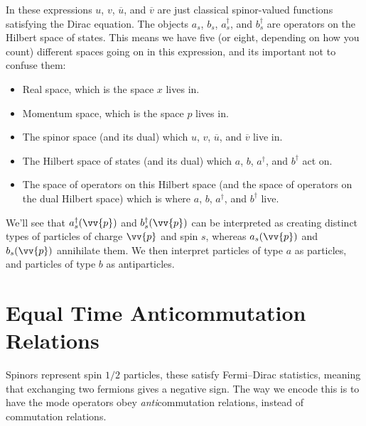 \documentclass[fleqn]{NotesClass}
\newcommand{\hermit}{{\dagger}}
\newcommand{\diracadjoint}[1]{\overbar{#1}}
\begin{document}
    In these expressions \(u\), \(v\), \(\diracadjoint{u}\), and \(\diracadjoint{v}\) are just classical spinor-valued functions satisfying the Dirac equation.
    The objects \(a_s\), \(b_s\), \(a_s^\hermit\), and \(b_s^\hermit\) are operators on the Hilbert space of states.
    This means we have five (or eight, depending on how you count) different spaces going on in this expression, and its important not to confuse them:
    \begin{itemize}
        \item Real space, which is the space \(x\) lives in.
        \item Momentum space, which is the space \(p\) lives in.
        \item The spinor space (and its dual) which \(u\), \(v\), \(\diracadjoint{u}\), and \(\diracadjoint{v}\) live in.
        \item The Hilbert space of states (and its dual) which \(a\), \(b\), \(a^\hermit\), and \(b^\hermit\) act on.
        \item The space of operators on this Hilbert space (and the space of operators on the dual Hilbert space) which is where \(a\), \(b\), \(a^\hermit\), and \(b^\hermit\) live.
    \end{itemize}
    
    We'll see that \(a_s^\hermit(\vv{p})\) and \(b_s^\hermit(\vv{p})\) can be interpreted as creating distinct types of particles of charge \(\vv{p}\) and spin \(s\), whereas \(a_s(\vv{p})\) and \(b_s(\vv{p})\) annihilate them.
    We then interpret particles of type \(a\) as particles, and particles of type \(b\) as antiparticles.
    
    \section{Equal Time Anticommutation Relations}
    Spinors represent spin \(1/2\) particles, these satisfy Fermi--Dirac statistics, meaning that exchanging two fermions gives a negative sign.
    The way we encode this is to have the mode operators obey \emph{anti}commutation relations, instead of commutation relations.
    
\end{document}
